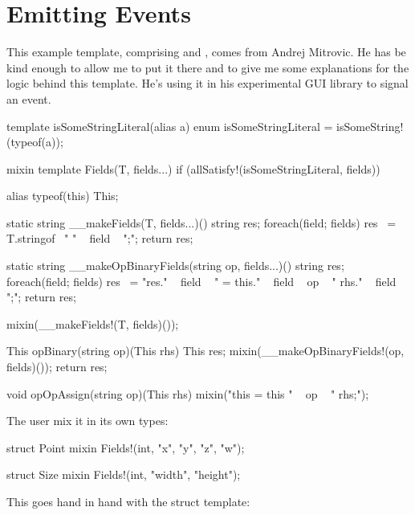 \section{Emitting Events}

This example template, comprising  and , comes from Andrej Mitrovic. He has be kind enough to allow me to put it there and to give me some explanations for the logic behind this template. He's using it in his experimental GUI library to signal an event.

\begin{dcode}
template isSomeStringLiteral(alias a)
{
    enum isSomeStringLiteral = isSomeString!(typeof(a));
}

mixin template Fields(T, fields...) 
    if (allSatisfy!(isSomeStringLiteral, fields))
{
    alias typeof(this) This;

    static string __makeFields(T, fields...)()
    {
        string res;
        foreach(field; fields) res ~= T.stringof~ " " ~ field ~ ";\n";
        return res;
    }

    static string __makeOpBinaryFields(string op, fields...)()
    {
        string res;
        foreach(field; fields) 
            res ~= "res." ~ field 
                 ~ " = this." ~ field ~ op ~ " rhs." ~ field ~ ";\n";
        return res;
    }

    mixin(__makeFields!(T, fields)());

    This opBinary(string op)(This rhs)
    {
        This res;
        mixin(__makeOpBinaryFields!(op, fields)());
        return res;
    }

    void opOpAssign(string op)(This rhs)
    {
        mixin("this = this " ~ op ~ " rhs;");
    }                
}
\end{dcode}

The user mix it in its own types:

\begin{dcode}
struct Point {
    mixin Fields!(int, "x", "y", "z", "w");
}

struct Size {
    mixin Fields!(int, "width", "height");
}
\end{dcode}

This goes hand in hand with the  struct template:

